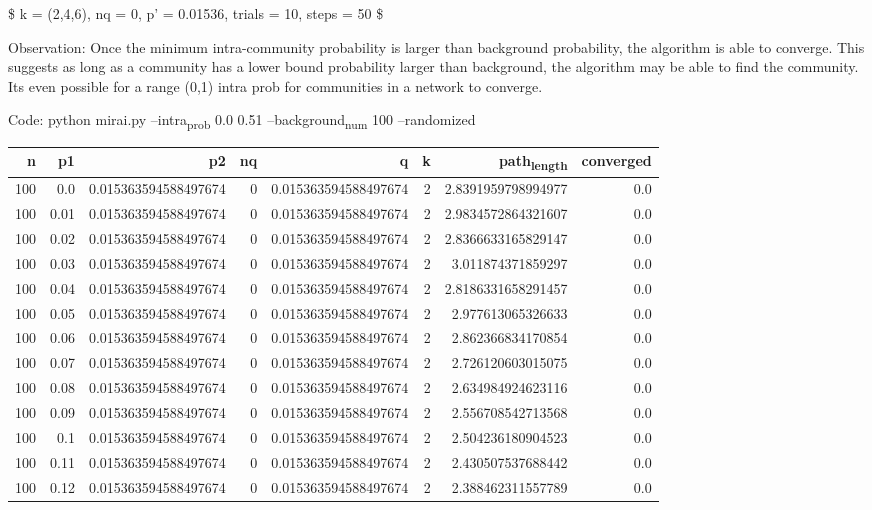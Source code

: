\documentclass[11pt]{article}
\begin{document}
\$ k = (2,4,6), nq = 0, p' = 0.01536, trials = 10, steps = 50 \$

Observation:
Once the minimum intra-community probability is larger than background probability, the algorithm
is able to converge. This suggests as long as a community has a lower bound probability larger than
background, the algorithm may be able to find the community. Its even possible for a range (0,1) intra
prob for communities in a network to converge.

Code: python mirai.py --intra\textsubscript{prob} 0.0 0.51 --background\textsubscript{num} 100 --randomized

\begin{center}
\begin{tabular}{rrrrrrrr}
\hline
n & p1 & p2 & nq & q & k & path\textsubscript{length} & converged\\
\hline
100 & 0.0 & 0.015363594588497674 & 0 & 0.015363594588497674 & 2 & 2.8391959798994977 & 0.0\\
100 & 0.01 & 0.015363594588497674 & 0 & 0.015363594588497674 & 2 & 2.9834572864321607 & 0.0\\
100 & 0.02 & 0.015363594588497674 & 0 & 0.015363594588497674 & 2 & 2.8366633165829147 & 0.0\\
100 & 0.03 & 0.015363594588497674 & 0 & 0.015363594588497674 & 2 & 3.011874371859297 & 0.0\\
100 & 0.04 & 0.015363594588497674 & 0 & 0.015363594588497674 & 2 & 2.8186331658291457 & 0.0\\
100 & 0.05 & 0.015363594588497674 & 0 & 0.015363594588497674 & 2 & 2.977613065326633 & 0.0\\
100 & 0.06 & 0.015363594588497674 & 0 & 0.015363594588497674 & 2 & 2.862366834170854 & 0.0\\
100 & 0.07 & 0.015363594588497674 & 0 & 0.015363594588497674 & 2 & 2.726120603015075 & 0.0\\
100 & 0.08 & 0.015363594588497674 & 0 & 0.015363594588497674 & 2 & 2.634984924623116 & 0.0\\
100 & 0.09 & 0.015363594588497674 & 0 & 0.015363594588497674 & 2 & 2.556708542713568 & 0.0\\
100 & 0.1 & 0.015363594588497674 & 0 & 0.015363594588497674 & 2 & 2.504236180904523 & 0.0\\
100 & 0.11 & 0.015363594588497674 & 0 & 0.015363594588497674 & 2 & 2.430507537688442 & 0.0\\
100 & 0.12 & 0.015363594588497674 & 0 & 0.015363594588497674 & 2 & 2.388462311557789 & 0.0\\

\end{tabular}
\end{center}
\end{document}
